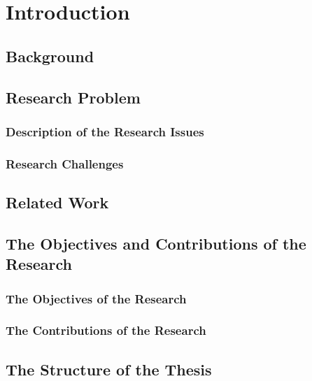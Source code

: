 
\chapter{Introduction}  %

\ifpdf
    \graphicspath{{Chapter1/Figs/Raster/}{Chapter1/Figs/PDF/}{Chapter1/Figs/}}
\else
    \graphicspath{{Chapter1/Figs/Vector/}{Chapter1/Figs/}}
\fi


\section{Background} %



\section{Research Problem} %



\subsection{Description of the Research Issues}



\subsection{Research Challenges}



\section{Related Work}



\section{The Objectives and Contributions of the Research}



\subsection{The Objectives of the Research}



\subsection{The Contributions of the Research}



\section{The Structure of the Thesis}